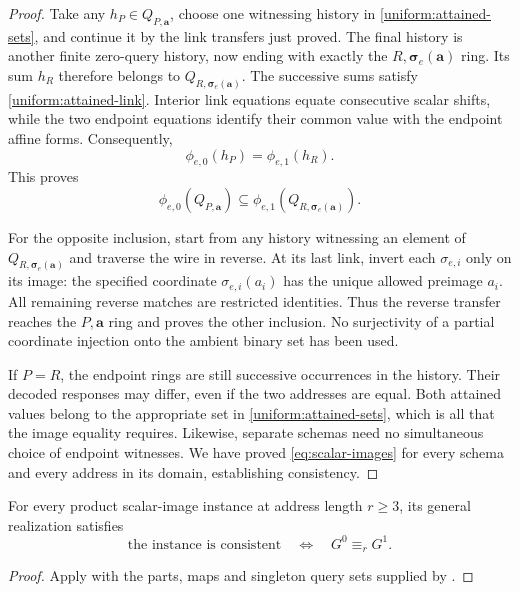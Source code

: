 \begin{proof}
Take any $h_P\in Q_{P,\mathbf a}$, choose one witnessing history in
\eqref{uniform:attained-sets}, and continue it by the link transfers just
proved.  The final history is another finite zero-query history, now ending
with exactly the $R,\boldsymbol\sigma_e(\mathbf a)$ ring.  Its sum
$h_R$ therefore belongs to
$Q_{R,\boldsymbol\sigma_e(\mathbf a)}$.  The successive sums satisfy
\eqref{uniform:attained-link}.  Interior link equations equate consecutive
scalar shifts, while the two endpoint equations identify their common
value with the endpoint affine forms.  Consequently,
\[
 \phi_{e,0}(h_P)=\phi_{e,1}(h_R).
\]
This proves
\[
 \phi_{e,0}(Q_{P,\mathbf a})
 \subseteq
 \phi_{e,1}(Q_{R,\boldsymbol\sigma_e(\mathbf a)}).
\]

For the opposite inclusion, start from any history witnessing an element
of $Q_{R,\boldsymbol\sigma_e(\mathbf a)}$ and traverse the wire in reverse.
At its last link, invert each $\sigma_{e,i}$ only on its image: the
specified coordinate $\sigma_{e,i}(a_i)$ has the unique allowed preimage
$a_i$.  All remaining reverse matches are restricted identities.  Thus
the reverse transfer reaches the $P,\mathbf a$ ring and proves the other
inclusion.  No surjectivity of a partial coordinate injection onto the
ambient binary set has been used.

If $P=R$, the endpoint rings are still successive occurrences in the
history.  Their decoded responses may differ, even if the two addresses
are equal.  Both attained values belong to the appropriate set in
\eqref{uniform:attained-sets}, which is all that the image equality requires.
Likewise, separate schemas need no simultaneous choice of endpoint
witnesses.  We have proved \eqref{eq:scalar-images} for every schema and
every address in its domain, establishing consistency.
\end{proof}


\begin{corollary}
\label{cor:general-game}
For every product scalar-image instance at address length \(r\ge3\),
its general realization satisfies
\[
 \text{the instance is consistent}\quad\Longleftrightarrow\quad
 G^0\equiv_r G^1.
\]
\end{corollary}
\begin{proof}
Apply  with the parts, maps and singleton
query sets supplied by .
\end{proof}
